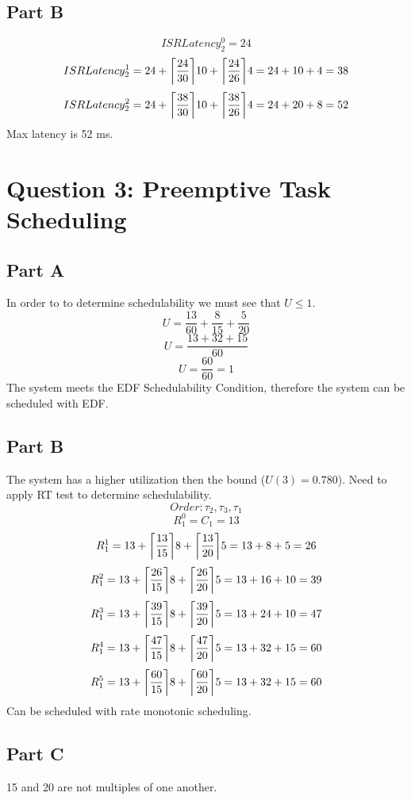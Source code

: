\documentclass{article}
\DeclarePairedDelimiter\ceil{\lceil}{\rceil}
\begin{document}
	\subsection*{Part B}
	$$ ISRLatency_2^0 = 24 $$
	$$ ISRLatency_2^1 = 24 + \ceil*{\frac{24}{30}}10+\ceil*{\frac{24}{26}}4=24+10+4=38$$
	$$ ISRLatency_2^2 = 24 + \ceil*{\frac{38}{30}}10+\ceil*{\frac{38}{26}}4=24+20+8=52$$
	Max latency is 52 ms.
	\section*{Question 3: Preemptive Task Scheduling}
	\subsection*{Part A}
	In order to to determine schedulability we must see that $ U \leq 1 $.
	$$ U = \frac{13}{60} + \frac{8}{15}+\frac{5}{20}$$
	$$ U = \frac{13+32+15}{60}$$
	$$ U = \frac{60}{60} = 1$$
	The system meets the EDF Schedulability Condition, therefore the system can be scheduled with EDF.
	\subsection*{Part B}
	The system has a higher utilization then the bound ($U(3) = 0.780$). Need to apply RT test to determine schedulability.
	$$Order: \tau_2, \tau_3, \tau_1 $$
	$$R_1^0=C_1=13$$
	$$R_1^1=13+\ceil*{\frac{13}{15}}8+\ceil*{\frac{13}{20}}5=13+8+5=26$$
	$$R_1^2=13+\ceil*{\frac{26}{15}}8+\ceil*{\frac{26}{20}}5=13+16+10=39$$
	$$R_1^3=13+\ceil*{\frac{39}{15}}8+\ceil*{\frac{39}{20}}5=13+24+10=47$$
	$$R_1^4=13+\ceil*{\frac{47}{15}}8+\ceil*{\frac{47}{20}}5=13+32+15=60$$
	$$R_1^5=13+\ceil*{\frac{60}{15}}8+\ceil*{\frac{60}{20}}5=13+32+15=60$$
	Can be scheduled with rate monotonic scheduling.
	\subsection*{Part C}
	15 and 20 are not multiples of one another.
\end{document}
